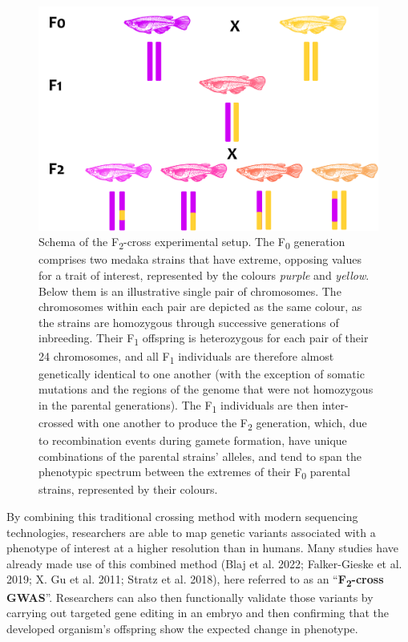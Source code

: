 \documentclass[
]{book}
\begin{document}
\begin{figure}
\includegraphics[width=1\linewidth]{figs/mikk_behaviour/F2-cross-schema} \caption{Schema of the F\textsubscript{2}-cross experimental setup. The F\textsubscript{0} generation comprises two medaka strains that have extreme, opposing values for a trait of interest, represented by the colours \emph{purple} and \emph{yellow}. Below them is an illustrative single pair of chromosomes. The chromosomes within each pair are depicted as the same colour, as the strains are homozygous through successive generations of inbreeding. Their F\textsubscript{1} offspring is heterozygous for each pair of their 24 chromosomes, and all F\textsubscript{1} individuals are therefore almost genetically identical to one another (with the exception of somatic mutations and the regions of the genome that were not homozygous in the parental generations). The F\textsubscript{1} individuals are then inter-crossed with one another to produce the F\textsubscript{2} generation, which, due to recombination events during gamete formation, have unique combinations of the parental strains' alleles, and tend to span the phenotypic spectrum between the extremes of their F\textsubscript{0} parental strains, represented by their colours.}\label{fig:F2-cross-schema}
\end{figure}

By combining this traditional crossing method with modern sequencing technologies, researchers are able to map genetic variants associated with a phenotype of interest at a higher resolution than in humans. Many studies have already made use of this combined method (Blaj et al. 2022; Falker-Gieske et al. 2019; X. Gu et al. 2011; Stratz et al. 2018), here referred to as an ``\textbf{F\textsubscript{2}-cross GWAS}''. Researchers can also then functionally validate those variants by carrying out targeted gene editing in an embryo and then confirming that the developed organism's offspring show the expected change in phenotype.
\end{document}

